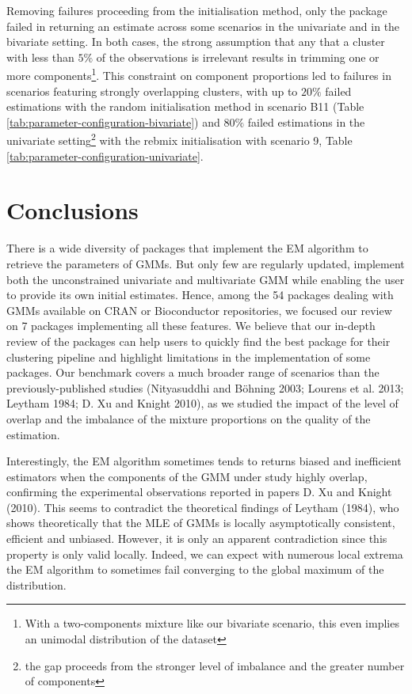 Removing failures proceeding from the initialisation method, only the  package failed in returning an estimate across some scenarios in the univariate and in the bivariate setting. In both cases, the strong assumption that any that a cluster with less than \(5\%\) of the observations is irrelevant results in trimming one or more components\footnote{With a two-components mixture like our bivariate scenario, this even implies an unimodal distribution of the dataset}. This constraint on component proportions led to failures in scenarios featuring strongly overlapping clusters, with up to \(20\%\) failed estimations with the random initialisation method in scenario
B11 (Table \ref{tab:parameter-configuration-bivariate}) and \(80\%\) failed estimations in the univariate setting\footnote{the gap proceeds from the stronger level of imbalance and the greater number of components} with the rebmix initialisation with scenario 9, Table \ref{tab:parameter-configuration-univariate}.

\hypertarget{conclusions}{%
\section{Conclusions}\label{conclusions}}

There is a wide diversity of packages that implement the EM algorithm to
retrieve the parameters of GMMs. But only few are regularly updated,
implement both the unconstrained univariate and multivariate GMM while enabling the user to provide
its own initial estimates. Hence, among the 54 packages dealing
with GMMs available on CRAN or Bioconductor repositories, we focused our
review on 7 packages implementing all these features. We believe that our in-depth review of the packages can help users to quickly find the best package for their clustering
pipeline and highlight limitations in the implementation of some
packages. Our benchmark covers a much broader range of scenarios
than the previously-published studies (Nityasuddhi and Böhning 2003; Lourens et al. 2013; Leytham 1984; D. Xu and Knight 2010), as we studied the impact of the
level of overlap and the imbalance of the mixture proportions on the
quality of the estimation.

Interestingly, the EM algorithm sometimes tends to returns biased and
inefficient estimators when the components of the GMM under study highly overlap, confirming the experimental observations reported in papers
D. Xu and Knight (2010). This seems to contradict the theoretical findings of Leytham (1984), who shows
theoretically that the MLE of GMMs is locally asymptotically consistent,
efficient and unbiased. However, it is only an apparent contradiction since this property is only valid locally. Indeed, we can expect with numerous local extrema the EM algorithm to sometimes fail converging to the global maximum of the distribution.

